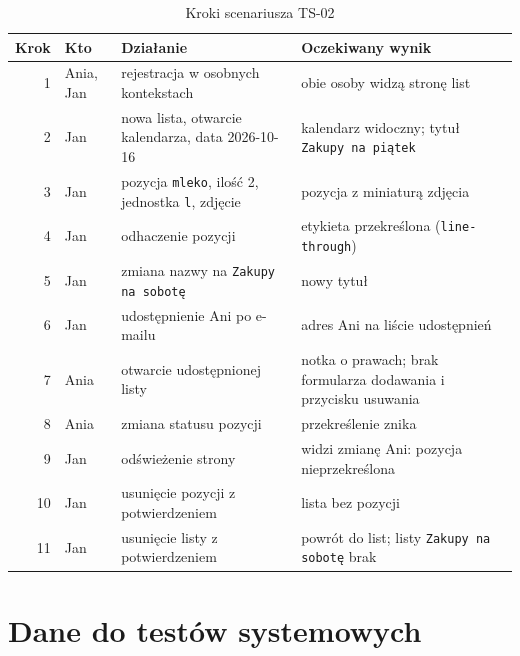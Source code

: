 \documentclass[a4paper,11pt]{article}
\newcommand{\code}[1]{\texttt{\small #1}}
\begin{document}
\begin{table}[H]
\centering\footnotesize
\begin{tabularx}{\textwidth}{@{}r l L L@{}}
\toprule
\textsf{\textbf{Krok}} & \textsf{\textbf{Kto}} & \textsf{\textbf{Działanie}} & \textsf{\textbf{Oczekiwany wynik}}\\
 & Ania, Jan & rejestracja w osobnych kontekstach & obie osoby widzą stronę list\\
2 & Jan & nowa lista, otwarcie kalendarza, data 2026-10-16 & kalendarz widoczny; tytuł \code{Zakupy na piątek}\\
3 & Jan & pozycja \code{mleko}, ilość 2, jednostka \code{l}, zdjęcie & pozycja z miniaturą zdjęcia\\
4 & Jan & odhaczenie pozycji & etykieta przekreślona (\code{line-through})\\
5 & Jan & zmiana nazwy na \code{Zakupy na sobotę} & nowy tytuł\\
6 & Jan & udostępnienie Ani po e-mailu & adres Ani na liście udostępnień\\
7 & Ania & otwarcie udostępnionej listy & notka o prawach; brak formularza dodawania i przycisku usuwania\\
8 & Ania & zmiana statusu pozycji & przekreślenie znika\\
9 & Jan & odświeżenie strony & widzi zmianę Ani: pozycja nieprzekreślona\\
10 & Jan & usunięcie pozycji z potwierdzeniem & lista bez pozycji\\
11 & Jan & usunięcie listy z potwierdzeniem & powrót do list; listy \code{Zakupy na sobotę} brak\\
\bottomrule
\end{tabularx}
\caption{Kroki scenariusza TS-02}
\label{tab:ts02}
\end{table}

\section{Dane do testów systemowych}
\end{document}

